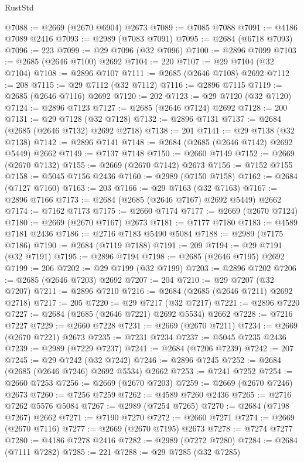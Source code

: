 \begin{lexlean}{RustStd}
\begin{coremodule}
@7088 := @2669 (@2670 @6904) @2673
@7089 := @7085 @7088
@7091 := @4186 @7089 @2416
@7093 := @2989 (@7083 @7091)
@7095 := @2684 (@6718 @7093)
@7096 := 223
@7099 := @29 @7096 (@32 @7096)
@7100 := @2896 @7099
@7103 := @2685 (@2646 @7100) @2692
@7104 := 220
@7107 := @29 @7104 (@32 @7104)
@7108 := @2896 @7107
@7111 := @2685 (@2646 @7108) @2692
@7112 := 208
@7115 := @29 @7112 (@32 @7112)
@7116 := @2896 @7115
@7119 := @2685 (@2646 @7116) @2692
@7120 := 202
@7123 := @29 @7120 (@32 @7120)
@7124 := @2896 @7123
@7127 := @2685 (@2646 @7124) @2692
@7128 := 200
@7131 := @29 @7128 (@32 @7128)
@7132 := @2896 @7131
@7137 := @2684 (@2685 (@2646 @7132) @2692 @2718)
@7138 := 201
@7141 := @29 @7138 (@32 @7138)
@7142 := @2896 @7141
@7148 := @2684 (@2685 (@2646 @7142) @2692 @5449) @2662
@7149 := @7137 @7148
@7150 := @2660 @7149
@7152 := @2669 (@2670 @7132)
@7155 := @2669 (@2670 @7142) @2673
@7156 := @7152 @7155
@7158 := @5045 @7156 @2436
@7160 := @2989 (@7150 @7158)
@7162 := @2684 (@7127 @7160)
@7163 := 203
@7166 := @29 @7163 (@32 @7163)
@7167 := @2896 @7166
@7173 := @2684 (@2685 (@2646 @7167) @2692 @5449) @2662
@7174 := @7162 @7173
@7175 := @2660 @7174
@7177 := @2669 (@2670 @7124)
@7180 := @2669 (@2670 @7167) @2673
@7181 := @7177 @7180
@7183 := @4589 @7181 @2436
@7186 := @2716 @7183 @5490 @5084
@7188 := @2989 (@7175 @7186)
@7190 := @2684 (@7119 @7188)
@7191 := 209
@7194 := @29 @7191 (@32 @7191)
@7195 := @2896 @7194
@7198 := @2685 (@2646 @7195) @2692
@7199 := 206
@7202 := @29 @7199 (@32 @7199)
@7203 := @2896 @7202
@7206 := @2685 (@2646 @7203) @2692
@7207 := 204
@7210 := @29 @7207 (@32 @7207)
@7211 := @2896 @7210
@7216 := @2684 (@2685 (@2646 @7211) @2692 @2718)
@7217 := 205
@7220 := @29 @7217 (@32 @7217)
@7221 := @2896 @7220
@7227 := @2684 (@2685 (@2646 @7221) @2692 @5534) @2662
@7228 := @7216 @7227
@7229 := @2660 @7228
@7231 := @2669 (@2670 @7211)
@7234 := @2669 (@2670 @7221) @2673
@7235 := @7231 @7234
@7237 := @5045 @7235 @2436
@7239 := @2989 (@7229 @7237)
@7241 := @2684 (@7206 @7239)
@7242 := 207
@7245 := @29 @7242 (@32 @7242)
@7246 := @2896 @7245
@7252 := @2684 (@2685 (@2646 @7246) @2692 @5534) @2662
@7253 := @7241 @7252
@7254 := @2660 @7253
@7256 := @2669 (@2670 @7203)
@7259 := @2669 (@2670 @7246) @2673
@7260 := @7256 @7259
@7262 := @4589 @7260 @2436
@7265 := @2716 @7262 @5576 @5084
@7267 := @2989 (@7254 @7265)
@7270 := @2684 (@7198 @7267) @2662
@7271 := @7190 @7270
@7272 := @2660 @7271
@7274 := @2669 (@2670 @7116)
@7277 := @2669 (@2670 @7195) @2673
@7278 := @7274 @7277
@7280 := @4186 @7278 @2416
@7282 := @2989 (@7272 @7280)
@7284 := @2684 (@7111 @7282)
@7285 := 221
@7288 := @29 @7285 (@32 @7285)

\end{coremodule}
\end{lexlean}
